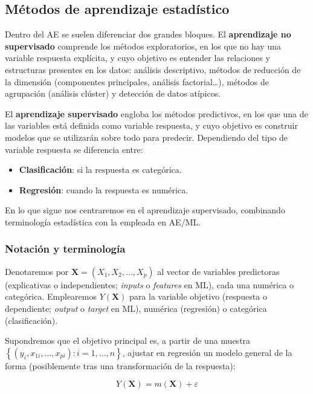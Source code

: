 \documentclass[
]{book}
\renewcommand{\mathbf}[1]{\symbf{#1}}
\theoremstyle{break}
\theoremstyle{nonumberplain}
\begin{document}
\subsection{Métodos de aprendizaje estadístico}\label{muxe9todos-de-aprendizaje-estaduxedstico}

Dentro del AE se suelen diferenciar dos grandes bloques. El \textbf{aprendizaje no supervisado} comprende los métodos exploratorios, en los que no hay una variable respuesta explícita, y cuyo objetivo es entender las relaciones y estructuras presentes en los datos: análisis descriptivo, métodos de reducción de la dimensión (componentes principales, análisis factorial\ldots), métodos de agrupación (análisis clúster) y detección de datos atípicos.

El \textbf{aprendizaje supervisado} engloba los métodos predictivos, en los que una de las variables está definida como variable respuesta, y cuyo objetivo es construir modelos que se utilizarán sobre todo para predecir. Dependiendo del tipo de variable respuesta se diferencia entre:

\begin{itemize}
\item
  \textbf{Clasificación}: si la respuesta es categórica.
\item
  \textbf{Regresión}: cuando la respuesta es numérica.
\end{itemize}

En lo que sigue nos centraremos en el aprendizaje supervisado, combinando terminología estadística con la empleada en AE/ML.

\subsubsection{Notación y terminología}\label{notacion}

Denotaremos por \(\mathbf{X}=(X_1, X_2, \ldots, X_p)\) al vector de variables predictoras (explicativas o independientes; \emph{inputs} o \emph{features} en ML), cada una numérica o categórica. Emplearemos \(Y(\mathbf{X})\) para la variable objetivo (respuesta o dependiente; \emph{output} o \emph{target} en ML), numérica (regresión) o categórica (clasificación).

Supondremos que el objetivo principal es, a partir de una muestra \(\left\{\left( y_{i}, x_{1i}, \ldots, x_{pi} \right)  : i = 1, \ldots, n \right\}\), ajustar en regresión un modelo general de la forma (posiblemente tras una transformación de la respuesta):

\begin{equation}
  Y(\mathbf{X})=m(\mathbf{X})+\varepsilon
  \label{eq:modelogeneral}
\end{equation}
\end{document}
